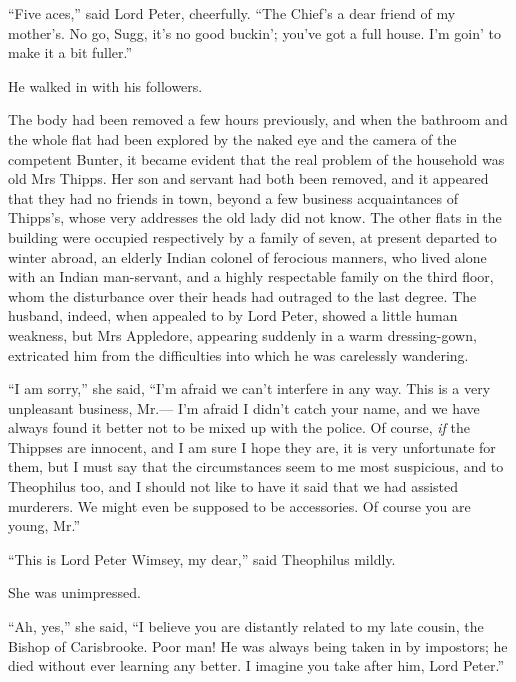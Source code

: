 \enquote{Five aces,} said Lord Peter, cheerfully. \enquote{The Chief’s a dear friend of my mother’s. No go, Sugg, it’s no good buckin’; you’ve got a full house. I’m goin’ to make it a bit fuller.}

He walked in with his followers.

The body had been removed a few hours previously, and when the bathroom and the whole flat had been explored by the naked eye and the camera of the competent Bunter, it became evident that the real problem of the household was old Mrs Thipps. Her son and servant had both been removed, and it appeared that they had no friends in town, beyond a few business acquaintances of Thipps’s, whose very addresses the old lady did not know. The other flats in the building were occupied respectively by a family of seven, at present departed to winter abroad, an elderly Indian colonel of ferocious manners, who lived alone with an Indian man-servant, and a highly respectable family on the third floor, whom the disturbance over their heads had outraged to the last degree. The husband, indeed, when appealed to by Lord Peter, showed a little human weakness, but Mrs Appledore, appearing suddenly in a warm dressing-gown, extricated him from the difficulties into which he was carelessly wandering.

\enquote{I am sorry,} she said, \enquote{I’m afraid we can’t interfere in any way. This is a very unpleasant business, Mr.--- I’m afraid I didn’t catch your name, and we have always found it better not to be mixed up with the police. Of course, \textit{if} the Thippses are innocent, and I am sure I hope they are, it is very unfortunate for them, but I must say that the circumstances seem to me most suspicious, and to Theophilus too, and I should not like to have it said that we had assisted murderers. We might even be supposed to be accessories. Of course you are young, Mr.\longdash}

\enquote{This is Lord Peter Wimsey, my dear,} said Theophilus mildly.

She was unimpressed.

\enquote{Ah, yes,} she said, \enquote{I believe you are distantly related to my late cousin, the Bishop of Carisbrooke. Poor man! He was always being taken in by impostors; he died without ever learning any better. I imagine you take after him, Lord Peter.}


